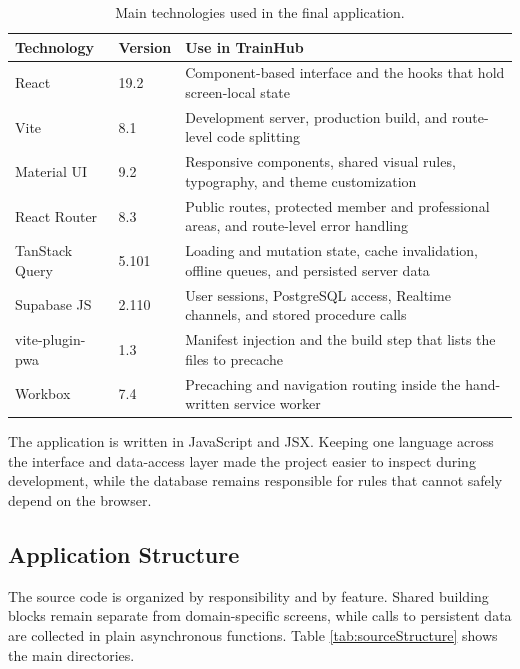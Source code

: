 \begin{table}[H]
    \centering
    \small
    \begin{tabularx}{\textwidth}{@{}p{} p{} >{\raggedright\arraybackslash}X@{}}
        \toprule
        \textbf{Technology} & \textbf{Version} & \textbf{Use in TrainHub} \\
        \midrule
        React & 19.2 & Component-based interface and the hooks that hold screen-local state \\
        Vite & 8.1 & Development server, production build, and route-level code splitting \\
        Material UI & 9.2 & Responsive components, shared visual rules, typography, and theme customization \\
        React Router & 8.3 & Public routes, protected member and professional areas, and route-level error handling \\
        TanStack Query & 5.101 & Loading and mutation state, cache invalidation, offline queues, and persisted server data \\
        Supabase JS & 2.110 & User sessions, PostgreSQL access, Realtime channels, and stored procedure calls \\
        vite-plugin-pwa & 1.3 & Manifest injection and the build step that lists the files to precache \\
        Workbox & 7.4 & Precaching and navigation routing inside the hand-written service worker \\
        \bottomrule
    \end{tabularx}
    \caption{Main technologies used in the final application.}
    \label{tab:technologyStack}
\end{table}

The application is written in JavaScript and JSX. Keeping one language across the interface and data-access layer made the project easier to inspect during development, while the database remains responsible for rules that cannot safely depend on the browser.

\subsection{Application Structure}\label{subsect:ApplicationStructure}

The source code is organized by responsibility and by feature. Shared building blocks remain separate from domain-specific screens, while calls to persistent data are collected in plain asynchronous functions. Table \ref{tab:sourceStructure} shows the main directories.

